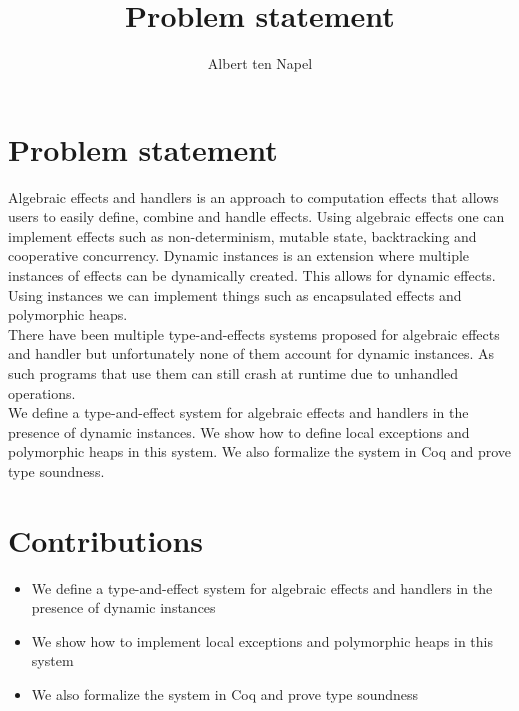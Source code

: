 \documentclass[12pt]{article}
\title{Problem statement}
\author{Albert ten Napel}
\date{}
\begin{document}
\maketitle

\section{Problem statement}
Algebraic effects and handlers is an approach to computation effects that allows users to easily define, combine and handle effects. Using algebraic effects one can implement effects such as non-determinism, mutable state, backtracking and cooperative concurrency.
Dynamic instances is an extension where multiple instances of effects can be dynamically created. This allows for dynamic effects. Using instances we can implement things such as encapsulated effects and polymorphic heaps.
\\
There have been multiple type-and-effects systems proposed for algebraic effects and handler but unfortunately none of them account for dynamic instances. As such programs that use them can still crash at runtime due to unhandled operations. \\
We define a type-and-effect system for algebraic effects and handlers in the presence of dynamic instances.
We show how to define local exceptions and polymorphic heaps in this system.
We also formalize the system in Coq and prove type soundness.

\section{Contributions}
\begin{itemize}
\item We define a type-and-effect system for algebraic effects and handlers in the presence of dynamic instances
\item We show how to implement local exceptions and polymorphic heaps in this system
\item We also formalize the system in Coq and prove type soundness
\end{itemize}
\end{document}
